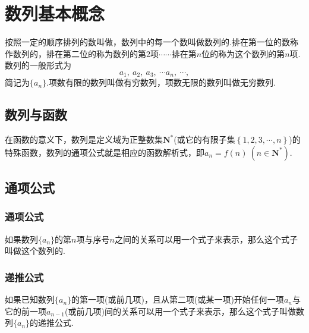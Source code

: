 \documentclass{BHCexam}
\begin{document}
\setcounter{tocdepth}{2}
\fubiaoti{}
\maketitle
\tableofcontents
\newpage 
\section{数列基本概念}
按照一定的顺序排列的数叫做，数列中的每一个数叫做数列的.排在第一位的数称作数列的，排在第二位的称为数列的第$ 2 $项$ \cdots\cdots $排在第$ n $位的称为这个数列的第$ n $项.数列的一般形式为\[a_1,~a_2,~a_3,~\cdots a_n,~\cdots, \]简记为$ \{a_n\} $.项数有限的数列叫做有穷数列，项数无限的数列叫做无穷数列.
\subsection{数列与函数}
在函数的意义下，数列是定义域为正整数集$ \mathbf{N^*} $(或它的有限子集$ \left\{1,2,3,\cdots,n\right\} $)的特殊函数，数列的通项公式就是相应的函数解析式，即$ a_n=f(n)~(n\in\mathbf{N^*}) $.
\subsection{通项公式}
\subsubsection{通项公式}
如果数列$\{a_n\}$的第$ n $项与序号$ n $之间的关系可以用一个式子来表示，那么这个式子叫做这个数列的. 
\subsubsection{递推公式}
如果已知数列$\{a_n\}$的第一项(或前几项)，且从第二项(或某一项)开始任何一项$ a_n $与它的前一项$ a_{n-1} $(或前几项)间的关系可以用一个式子来表示，那么这个式子叫做数列$\{a_n\}$的递推公式.
\end{document}
